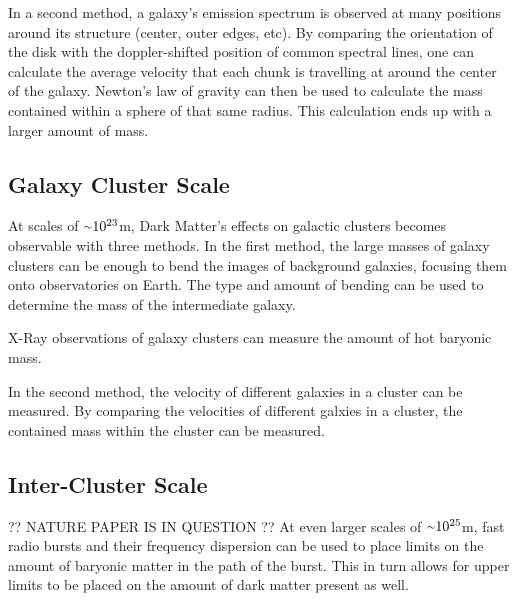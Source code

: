 In a second method, a galaxy's emission spectrum is observed at many positions around its structure (center, outer edges, etc).
By comparing the orientation of the disk with the doppler-shifted position of common spectral lines, one can calculate the average velocity that each chunk is travelling at around the center of the galaxy.
Newton's law of gravity can then be used to calculate the mass contained within a sphere of that same radius.
This calculation ends up with a larger amount of mass.

\subsection{Galaxy Cluster Scale}
%
At scales of $\nicetilde 10^{23}$m, Dark Matter's effects on galactic clusters becomes observable with three methods.
In the first method, the large masses of galaxy clusters can be enough to bend the images of background galaxies, focusing them onto observatories on Earth.
The type and amount of bending can be used to determine the mass of the intermediate galaxy.

X-Ray observations of galaxy clusters can measure the amount of hot baryonic mass.

In the second method, the velocity of different galaxies in a cluster can be measured.
By comparing the velocities of different galxies in a cluster, the contained mass within the cluster can be measured.

\subsection{Inter-Cluster Scale}
?? NATURE PAPER IS IN QUESTION ??
At even larger scales of $\nicetilde 10^{25}$m, fast radio bursts and their frequency dispersion can be used to place limits on the amount of baryonic matter in the path of the burst.
This in turn allows for upper limits to be placed on the amount of dark matter present as well.



